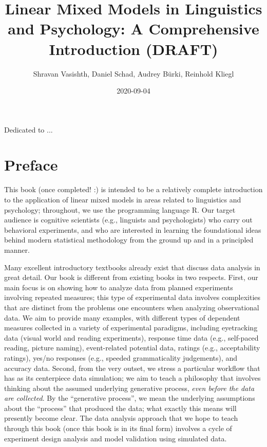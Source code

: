 \documentclass[12pt,]{krantz}
\title{Linear Mixed Models in Linguistics and Psychology: A Comprehensive Introduction (DRAFT)}
\author{Shravan Vasishth, Daniel Schad, Audrey Bürki, Reinhold Kliegl}
\date{2020-09-04}
\begin{document}
\maketitle

\thispagestyle{empty}
\begin{center}
Dedicated to ...
\end{center}

\setlength{\abovedisplayskip}{-5pt}
\setlength{\abovedisplayshortskip}{-5pt}

{
\hypersetup{linkcolor=}
\setcounter{tocdepth}{2}
\tableofcontents
}
\hypertarget{preface}{%
\chapter*{Preface}\label{preface}}


This book (once completed! :) is intended to be a relatively complete introduction to the application of linear mixed models in areas related to linguistics and psychology; throughout, we use the programming language R. Our target audience is cognitive scientists (e.g., linguists and psychologists) who carry out behavioral experiments, and who are interested in learning the foundational ideas behind modern statistical methodology from the ground up and in a principled manner.

Many excellent introductory textbooks already exist that discuss data analysis in great detail. Our book is different from existing books in two respects. First, our main focus is on showing how to analyze data from planned experiments involving repeated measures; this type of experimental data involves complexities that are distinct from the problems one encounters when analyzing observational data. We aim to provide many examples, with different types of dependent measures collected in a variety of experimental paradigms, including
eyetracking data (visual world and reading experiments), response time data (e.g., self-paced reading, picture naming), event-related potential data, ratings (e.g., acceptability ratings), yes/no responses (e.g., speeded grammaticality judgements), and accuracy data. Second, from the very outset, we stress a particular workflow that has as its centerpiece data simulation; we aim to teach a philosophy that involves thinking about the assumed underlying generative process, \emph{even before the data are collected}. By the ``generative process'', we mean the underlying assumptions about the ``process'' that produced the data; what exactly this means will presently become clear.
The data analysis approach that we hope to teach through this book (once this book is in its final form) involves a cycle of experiment design analysis and model validation using simulated data.
\end{document}
